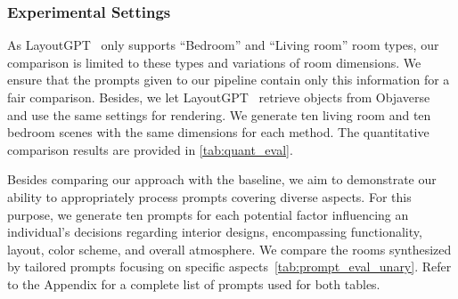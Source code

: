\documentclass[runningheads]{llncs}
\newcommand{\methodname}{I-Design\xspace}
\begin{document}


\subsubsection{Experimental Settings}

As LayoutGPT~\cite{feng2023layoutgpt} only supports ``Bedroom'' and ``Living room'' room types, our comparison is limited to these types and variations of room dimensions. 
We ensure that the prompts given to our pipeline contain only this information for a fair comparison. 
Besides, we let LayoutGPT~\cite{feng2023layoutgpt} retrieve objects from Objaverse~\cite{deitke2023objaverse} and use the same settings for rendering. 
We generate ten living room and ten bedroom scenes with the same dimensions for each method. The quantitative comparison results are provided in \cref{tab:quant_eval}.

\begin{table}[tb]
\caption{
\textbf{Quantitative comparison with LayoutGPT~\cite{feng2023layoutgpt}.}
Both methods generate 10 ``Bedroom'' and 10 ``Living room'' scenes of varying room sizes.
The objective metrics are:
an average number of objects (NObj), out-of-bounds rate (OOB), and bounding box loss (BBL). 
Subjective metrics:
GPT-4V~\cite{achiam2023gpt} is used as a human-aligned evaluator assessing the following scene aspects: functionality and activity-based alignment (Func.), layout and furniture (Layout.), color scheme and material choice (Scheme.), overall aesthetic and atmosphere (Atmos.). 
The evaluator LLM is prompted to evaluate the alignment of the user input with the rendered scene, assign a grade from 0 to 10, and explain the reasoning behind the assignment (Sec.~\ref{sec:metrics}). 
Each scene is evaluated 3 times, resulting in the mean and standard deviation per scene, averaged across scenes.
\methodname produces more realistic scenes, which score better in all metrics with tight confidence.
}
\label{tab:quant_eval}
\begin{center}
\vspace{-2em}
\resizebox{1.0\linewidth}{!}{

}
\vspace{-2em}
\end{center}
\end{table}

Besides comparing our approach with the baseline, we aim to demonstrate our ability to appropriately process prompts covering diverse aspects. For this purpose, we generate ten prompts for each potential factor influencing an individual's decisions regarding interior designs, encompassing functionality, layout, color scheme, and overall atmosphere. We compare the rooms synthesized by tailored prompts focusing on specific aspects~\cref{tab:prompt_eval_unary}.
Refer to the Appendix for a complete list of prompts used for both tables.
\end{document}
